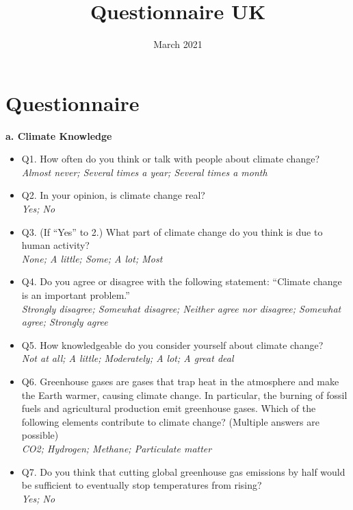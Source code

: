 \documentclass{article}
\title{Questionnaire UK}
\date{March 2021}
\begin{document}
\maketitle

\section{Questionnaire}
\begin{flushleft}
\textbf{a. Climate Knowledge}
\end{flushleft}
\begin{itemize}
    \item Q1. How often do you think or talk with people about climate change?\\
    \textit{Almost never; Several times a year; Several times a month}
    \item Q2. In your opinion, is climate change real?\\
    \textit{Yes; No}
    \item Q3. (If ``Yes'' to 2.) What part of climate change do you think is due to human activity?\\
    \textit{None; A little; Some; A lot; Most}

    \item Q4. Do you agree or disagree with the following statement: ``Climate change is an important problem.''\\
    \textit{Strongly disagree; Somewhat disagree; Neither agree nor disagree; Somewhat agree; Strongly agree}
    \item Q5. How knowledgeable do you consider yourself about climate change?\\
    \textit{Not at all; A little; Moderately; A lot; A great deal}
    \item Q6. Greenhouse gases are gases that trap heat in the atmosphere and make the Earth warmer, causing climate change. In particular, the burning of fossil fuels and agricultural production emit greenhouse gases.
    Which of the following elements contribute to climate change? (Multiple answers are possible) \\
    \textit{CO2; Hydrogen; Methane; Particulate matter}
    \item Q7. Do you think that cutting global greenhouse gas emissions by half would be sufficient to eventually stop temperatures from rising? \\
    \textit{Yes; No}


\end{itemize}
\end{document}
